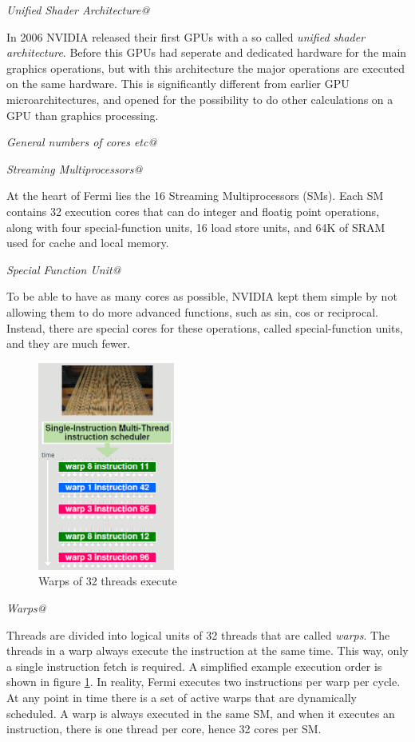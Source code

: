 \documentclass[../main/report.tex]{subfiles}
\begin{document}
\emph{Unified Shader Architecture@}

In 2006 NVIDIA released their first GPUs with a so called \emph{unified shader architecture}.
Before this GPUs had seperate and dedicated hardware for the main graphics operations, 
but with this architecture the major operations are executed on the same hardware.
This is significantly different from earlier GPU microarchitectures, and opened
for the possibility to do other calculations on a GPU than graphics processing.


\emph{General numbers of cores etc@}


\emph{Streaming Multiprocessors@}

At the heart of Fermi lies the 16 Streaming Multiprocessors (SMs). 
Each SM contains 32 execution cores that can do integer and floatig point operations, 
along with four special-function units, 16 load store units, 
and 64K of SRAM used for cache and local memory.

\emph{Special Function Unit@}

To be able to have as many cores as possible, NVIDIA kept them simple by not allowing them to do more advanced functions, such as sin, cos or reciprocal.
Instead, there are special cores for these operations, called special-function units, and they are much fewer.

\begin{figure}[H]
\centering
\includegraphics[width=0.4\textwidth]{../introduction/assets/warp.png}
\caption{Warps of 32 threads execute }
\label{fig:simple-nvidia-warps}
\end{figure}

\emph{Warps@}

Threads are divided into logical units of 32 threads that are called \emph{warps}. 
The threads in a warp always execute the instruction at the same time.
This way, only a single instruction fetch is required.
A simplified example execution order is shown in figure \ref{fig:simple-nvidia-warps}.
In reality, Fermi executes two instructions per warp per cycle. 
At any point in time there is a set of active warps that are dynamically scheduled. 
A warp is always executed in the same SM, and when it executes an instruction, there is one thread per core, hence 32 cores per SM.
\end{document}
